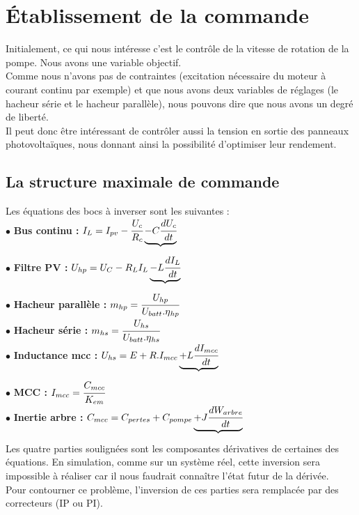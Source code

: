  
\section{Établissement de la commande}
Initialement, ce qui nous intéresse c'est le contrôle de la vitesse de rotation de la pompe. Nous avons une variable objectif.\\
Comme nous n'avons pas de contraintes (excitation nécessaire du moteur à courant continu par exemple) et que nous avons deux variables de réglages (le hacheur série et le hacheur parallèle), nous pouvons dire que nous avons un degré de liberté.\\
Il peut donc être intéressant de contrôler aussi la tension en sortie des panneaux photovoltaïques, nous donnant ainsi la possibilité d'optimiser leur rendement.\\

\subsection{La structure maximale de commande}
Les équations des bocs à inverser sont les suivantes : \\
$ \bullet $ \textbf{Bus continu :} $I_L = I_{pv} - \cfrac{U_c}{R_c} \underbrace{- C\cfrac{dU_c}{dt}}_\text{} $\\
$ \bullet $ \textbf{Filtre PV :} $U_{hp} = U_C - R_LI_L \underbrace{- L\cfrac{dI_L}{dt}}_\text{} $\\
$ \bullet $ \textbf{Hacheur parallèle :} $m_{hp} = \cfrac{U_{hp}}{U_{batt}.\eta{}_{hp}} $\\
$ \bullet $ \textbf{Hacheur série :} $m_{hs} = \cfrac{U_{hs}}{U_{batt}.\eta{}_{hs}} $\\
$ \bullet $ \textbf{Inductance mcc :} $U_{hs} = E + R.I_{mcc} \underbrace{+ L\cfrac{dI_{mcc}}{dt}}_\text{} $\\
$ \bullet $ \textbf{MCC :} $I_{mcc} = \cfrac{C_{mcc}}{K_{em}} $\\
$ \bullet $ \textbf{Inertie arbre :} $C_{mcc} = C_{pertes} + C_{pompe} \underbrace{+ J\cfrac{dW_{arbre}}{dt}}_\text{}$\\


Les quatre parties soulignées sont les composantes dérivatives de certaines des équations. En simulation, comme sur un système réel, cette inversion sera impossible à réaliser car il nous faudrait connaître l'état futur de la dérivée.\\
Pour contourner ce problème, l'inversion de ces parties sera remplacée par des correcteurs (IP ou PI).\\

